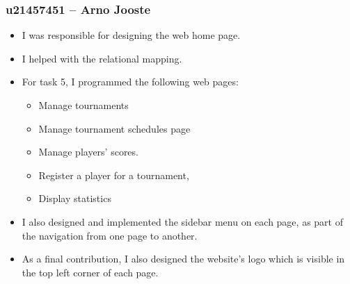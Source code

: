 \documentclass[titlepage]{article}
\begin{document}
\vspace{1em}
\subsubsection*{u21457451 – Arno Jooste}
\vspace{1em}
\begin{itemize}
  \item I was responsible for designing the web home page.
  \item I helped with the relational mapping.
  \item For task 5, I programmed the following web pages:
  \begin{itemize}
    \item Manage tournaments
    \item Manage tournament schedules page
    \item Manage players’ scores. 
    \item Register a player for a tournament,
    \item Display statistics
  \end{itemize}
  \item I also designed and implemented the sidebar menu on each page, as part of the navigation from one page to another. 
  \item As a final contribution, I also designed the website’s logo which is visible in the top left corner of each page.
\end{itemize}
\vspace{1em}
\end{document}
